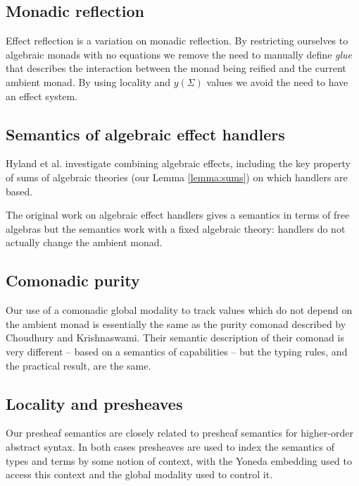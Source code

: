 \documentclass[acmsmall, screen, nonacm]{acmart}
\theoremstyle{definition}
\newcommand{\yoneda}[1]{y(#1)}
\begin{document}
\subsection{Monadic reflection}

Effect reflection is a variation on monadic
reflection\cite{filinski1999representing}. By restricting ourselves to
algebraic monads with no equations we remove the need to manually define
\emph{glue} that describes the interaction between the monad being
reified and the current ambient monad. By using locality and
$\yoneda{\Sigma}$ values we avoid the need to have an effect system.

\subsection{Semantics of algebraic effect handlers}

Hyland et al.\cite{hyland2006combining} investigate combining algebraic
effects, including the key property of sums of algebraic theories (our
Lemma \ref{lemma:sums}) on which handlers are based.

The original work on algebraic effect
handlers\cite{plotkin2009handlers,plotkin2013handling} gives a semantics
in terms of free algebras but the semantics work with a fixed algebraic
theory: handlers do not actually change the ambient monad.

\subsection{Comonadic purity}

Our use of a comonadic global modality to track values which do not
depend on the ambient monad is essentially the same as the purity
comonad described by Choudhury and
Krishnaswami\cite{choudhury2020recovering}. Their semantic description
of their comonad is very different -- based on a semantics of
capabilities -- but the typing rules, and the practical result, are the
same.

\subsection{Locality and presheaves}

Our presheaf semantics are closely related to presheaf semantics for
higher-order abstract syntax\cite{hu2022category}. In both cases
presheaves are used to index the semantics of types and terms by some
notion of context, with the Yoneda embedding used to access this context
and the global modality used to control it.



\end{document}
